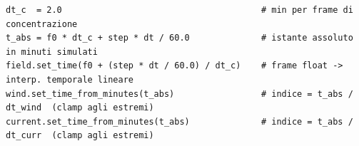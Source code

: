 \begin{lstlisting}
dt_c  = 2.0                                       # min per frame di concentrazione
t_abs = f0 * dt_c + step * dt / 60.0              # istante assoluto in minuti simulati
field.set_time(f0 + (step * dt / 60.0) / dt_c)    # frame float -> interp. temporale lineare
wind.set_time_from_minutes(t_abs)                 # indice = t_abs / dt_wind  (clamp agli estremi)
current.set_time_from_minutes(t_abs)              # indice = t_abs / dt_curr  (clamp agli estremi)
\end{lstlisting}
